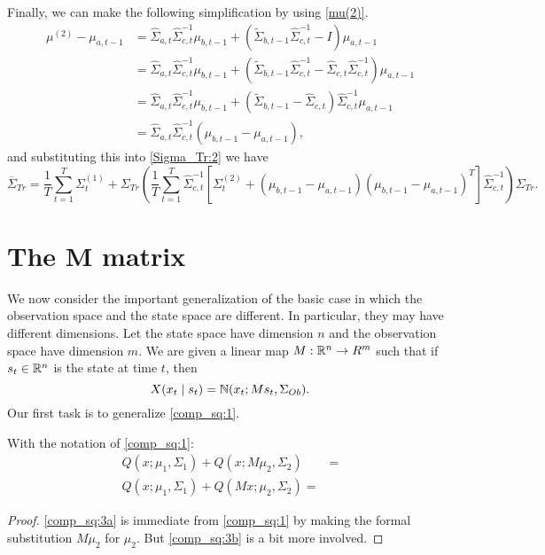 \documentclass[12pt,leqno]{article}
\begin{document}
Finally, we can make the following simplification by using \eqref{mu(2)}.
\begin{align*}
  \mu^{(2)} - \mu_{a,t-1} &= \widehat{\Sigma}_{a,t}\widehat{\Sigma}_{c,t}^{-1}\mu_{b,t-1} +
  (\widetilde{\Sigma}_{b,t-1}\widehat{\Sigma}_{c,t}^{-1}-I)\mu_{a,t-1}\\
  &= \widehat{\Sigma}_{a,t}\widehat{\Sigma}_{c,t}^{-1}\mu_{b,t-1} +
  (\widetilde{\Sigma}_{b,t-1}\widehat{\Sigma}_{c,t}^{-1}-\widehat{\Sigma}_{c,t}\widehat{\Sigma}_{c,t}^{-1})\mu_{a,t-1}\\
  &=  \widehat{\Sigma}_{a,t}\widehat{\Sigma}_{c,t}^{-1}\mu_{b,t-1} +
  (\widetilde{\Sigma}_{b,t-1}-\widehat{\Sigma}_{c,t})\widehat{\Sigma}_{c,t}^{-1}\mu_{a,t-1}\\
  &= \widehat{\Sigma}_{a,t}\widehat{\Sigma}_{c,t}^{-1}(\mu_{b,t-1} -\mu_{a,t-1}),
\end{align*}
and substituting this into \eqref{Sigma_Tr:2} we have
\begin{equation}\label{Sigma_Tr:3}
\overline{\Sigma}_{Tr}   =\frac{1}{T}\sum_{t=1}^T\Sigma^{(1)}_t+\Sigma_{Tr}\left(\frac{1}{T}\sum_{t=1}^T\widehat{\Sigma}_{c,t}^{-1}
   [\Sigma^{(2)}_t+(\mu_{b,t-1}-\mu_{a,t-1})(\mu_{b,t-1}-\mu_{a,t-1})^T]\widehat{\Sigma}_{c,t}^{-1}\right)\Sigma_{Tr}.
\end{equation}  

\section{The M matrix}
We now consider the important generalization of the basic case in which the observation space and the state space are different.
In particular, they may have different dimensions.  Let the state space have dimension $n$ and the observation space have
dimension $m$.  We are given a linear map $M: {\mathbb R}^n\rightarrow R^m$ such that if $s_t\in {\mathbb R}^n$ is the state at time $t$, then
$$
X(x_t\mid s_t)= {\mathbb N}(x_t;Ms_t,\Sigma_{Ob}).
$$
Our first task is to generalize \eqref{comp_sq:1}.

\begin{Lem}\label{comp_sq:3}
With the notation of \eqref{comp_sq:1}:
\begin{align}
  Q(x;\mu_1,\Sigma_1) + Q(x;M\mu_2,\Sigma_2) &= \label{comp_sq:3a}\\
  Q(x;\mu_1,\Sigma_1) + Q(Mx;\mu_2,\Sigma_2) = \label{comp_sq:3b}
\end{align}
\end{Lem}
\begin{proof}
\eqref{comp_sq:3a} is immediate from \eqref{comp_sq:1} by making the formal substitution $M\mu_2$ for $\mu_2$.  But \eqref{comp_sq:3b} is a bit more involved.  

\end{proof}
\end{document}
